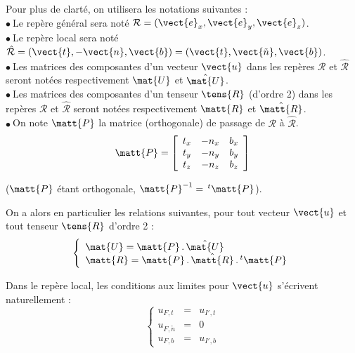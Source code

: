 Pour plus de clart\'e, on utilisera les notations suivantes :\\
$\bullet\ $Le rep\`ere g\'en\'eral sera not\'e
$\mathcal{R}=(\vect{e}_x,\vect{e}_y,\vect{e}_z)$.\\
$\bullet\ $Le rep\`ere local sera not\'e
$\hat{\mathcal{R}}=(\vect{t},-\vect{n},\vect{b})=(\vect{t},\vect{\tilde{n}},\vect{b})$.\\
$\bullet\ $Les matrices des composantes d'un vecteur $\vect{u}$ dans les rep\`eres
$\mathcal{R}$ et $\hat{\mathcal{R}}$ seront not\'ees respectivement
$\mat{U}$ et $\hat{\mat{U}}$.\\
$\bullet\ $Les matrices des composantes d'un tenseur $\tens{R}$ (d'ordre 2) dans
les rep\`eres $\mathcal{R}$ et $\hat{\mathcal{R}}$ seront not\'ees
respectivement $\matt{R}$ et $\hat{\matt{R}}$.\\
$\bullet\ $On note $\matt{P}$ la matrice (orthogonale) de passage de $\mathcal{R}$ \`a
$\hat{\mathcal{R}}$.
\begin{equation}
\matt{P}=\left[
\begin{array}{ccc}
t_x & -n_x & b_x\\
t_y & -n_y & b_y\\
t_z & -n_z & b_z
\end{array}\right]
\end{equation}

($\matt{P}$ \'etant orthogonale, $\matt{P}^{-1}=\,^t\matt{P}$).

On a alors en particulier les relations suivantes, pour tout vecteur $\vect{u}$
et tout tenseur $\tens{R}$ d'ordre 2 :\\
\begin{equation}
\left\{\begin{array}{l}
\mat{U} = \matt{P}\,.\,\hat{\mat{U}}\\
\matt{R}= \matt{P}\,.\,\hat{\matt{R}}\,.\,^t\matt{P}
\end{array}\right.
\end{equation}

Dans le rep\`ere local, les conditions aux limites pour $\vect{u}$ s'\'ecrivent
naturellement :\\
\begin{equation}
\left\{\begin{array}{lcl}
u_{F,t} & = & u_{I',t}\\
u_{F,\tilde{n}} & = & 0\\
u_{F,b} & = & u_{I',b}
\end{array}\right.
\end{equation}

